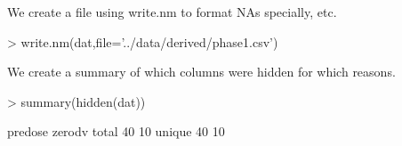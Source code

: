 We create a file using write.nm to format NAs specially, etc.
\begin{Schunk}
\begin{Sinput}
> write.nm(dat,file='../data/derived/phase1.csv')
\end{Sinput}
\end{Schunk}
We create a summary of which columns were hidden for which reasons.
\begin{Schunk}
\begin{Sinput}
> summary(hidden(dat))
\end{Sinput}
\begin{Soutput}
       predose zerodv
total       40     10
unique      40     10
\end{Soutput}
\end{Schunk}






